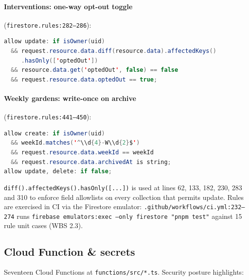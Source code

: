 \documentclass[11pt,a4paper]{article}
\begin{document}
\paragraph{Interventions: one-way opt-out toggle}
(\texttt{firestore.rules:282--286}):

\begin{lstlisting}[language=Java]
allow update: if isOwner(uid)
  && request.resource.data.diff(resource.data).affectedKeys()
     .hasOnly(['optedOut'])
  && resource.data.get('optedOut', false) == false
  && request.resource.data.optedOut == true;
\end{lstlisting}

\paragraph{Weekly gardens: write-once on archive}
(\texttt{firestore.rules:441--450}):

\begin{lstlisting}[language=Java]
allow create: if isOwner(uid)
  && weekId.matches('^\\d{4}-W\\d{2}$')
  && request.resource.data.weekId == weekId
  && request.resource.data.archivedAt is string;
allow update, delete: if false;
\end{lstlisting}

\texttt{diff().affectedKeys().hasOnly([...])} is used at lines 62, 133,
182, 230, 283 and 310 to enforce field allowlists on every collection
that permits update. Rules are exercised in CI via the Firestore
emulator: \texttt{.github/workflows/ci.yml:232--274} runs
\texttt{firebase emulators:exec --only firestore "pnpm test"} against
15 rule unit cases (WBS 2.3).

\subsection{Cloud Function \& secrets}

Seventeen Cloud Functions at \texttt{functions/src/*.ts}. Security
posture highlights:
\end{document}
